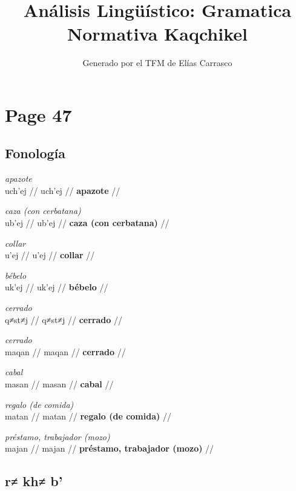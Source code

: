 \documentclass{article}%
\title{Análisis Lingüístico: Gramatica Normativa Kaqchikel}%
\author{Generado por el TFM de Elías Carrasco}%
\begin{document}
%
\normalsize%
\maketitle%
\section{Page 47}%
\label{sec:Page47}%
\subsection{Fonología}%
\label{subsec:Fonologa}%

%
\par\medskip%
\ex
\textit{apazote} \\
\begingl
\gla uch'ej //
\glb uch'ej //
\glc \textbf{apazote} //
\endgl
\xe
%
\medskip%
\par\medskip%
\ex
\textit{caza (con cerbatana)} \\
\begingl
\gla ub'ej //
\glb ub'ej //
\glc \textbf{caza (con cerbatana)} //
\endgl
\xe
%
\medskip%
\par\medskip%
\ex
\textit{collar} \\
\begingl
\gla u'ej //
\glb u'ej //
\glc \textbf{collar} //
\endgl
\xe
%
\medskip%
\par\medskip%
\ex
\textit{bébelo} \\
\begingl
\gla uk'ej //
\glb uk'ej //
\glc \textbf{bébelo} //
\endgl
\xe
%
\medskip%
\par\medskip%
\ex
\textit{cerrado} \\
\begingl
\gla q≠st≠j //
\glb q≠st≠j //
\glc \textbf{cerrado} //
\endgl
\xe
%
\medskip%
\par\medskip%
\ex
\textit{cerrado} \\
\begingl
\gla maqan //
\glb maqan //
\glc \textbf{cerrado} //
\endgl
\xe
%
\medskip%
\par\medskip%
\ex
\textit{cabal} \\
\begingl
\gla masan //
\glb masan //
\glc \textbf{cabal} //
\endgl
\xe
%
\medskip%
\par\medskip%
\ex
\textit{regalo (de comida)} \\
\begingl
\gla matan //
\glb matan //
\glc \textbf{regalo (de comida)} //
\endgl
\xe
%
\medskip%
\par\medskip%
\ex
\textit{préstamo, trabajador (mozo)} \\
\begingl
\gla majan //
\glb majan //
\glc \textbf{préstamo, trabajador (mozo)} //
\endgl
\xe
%
\medskip%
\subsection{r≠ kh≠ b'}%
\label{subsec:rkhb}%
\end{document}
